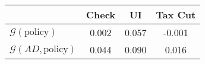 \begin{tabular}{@{}lccc@{}} 
\toprule 
                          & Check      & UI    & Tax Cut    \\  \midrule 
$\mathcal{G}(\text{policy})$ & 0.002  & 0.057  & -0.001     \\ 
$\mathcal{G}(AD,\text{policy})$ & 0.044  & 0.090  & 0.016     \\ 
\end{tabular}  
